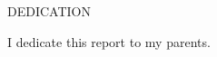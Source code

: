 \newpage
{}

\begin{center}
DEDICATION
\end{center}

\begin{center}
I dedicate this report to my parents.
\end{center}
